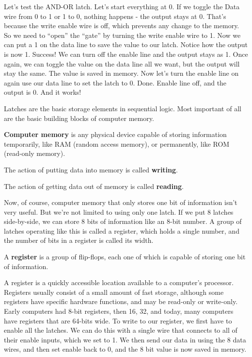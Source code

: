 
Let's test the AND-OR latch. Let's start everything at 0. If we toggle the Data wire from 0 to 1 or 1 to 0, nothing
happens - the output stays at 0. That's because the write enable wire is off, which prevents any change to the
memory. So we need to ``open'' the ``gate'' by turning the write enable wire to 1. Now we can put a 1 on the data
line to save the value to our latch. Notice how the output is now 1. Success! We can turn off the enable line and the
output stays as 1. Once again, we can toggle the value on the data line all we want, but the output will stay the
same. The value is saved in memory. Now let's turn the enable line on again use our data line to set the latch to 0.
Done. Enable line off, and the output is 0. And it works!
\ee

Latches are the basic storage elements in sequential logic. Most important of all are the basic building blocks of
computer memory.

\textbf{Computer memory} is any physical device capable of storing information temporarily, like RAM (random access
memory), or permanently, like ROM (read-only memory).
\ed

\bd[Writing]
The action of putting data into memory is called \textbf{writing}.
\ed

\bd[Reading]
The action of getting data out of memory is called \textbf{reading}.
\ed

Now, of course, computer memory that only stores one bit of information isn't very useful. But we're not limited to
using only one latch. If we put 8 latches side-by-side, we can store 8 bits of information like an 8-bit number. A
group of latches operating like this is called a register, which holds a single number, and the number of bits in a
register is called its width.

\bd[Register]
A \textbf{register} is a group of flip-flops, each one of which is capable of storing one bit of information.
\ed

A register is a quickly accessible location available to a computer's processor. Registers usually consist of a small
amount of fast storage, although some registers have specific hardware functions, and may be read-only or write-only.
Early computers had 8-bit registers, then 16, 32, and today, many computers have registers that are 64-bits wide. To
write to our register, we first have to enable all the latches. We can do this with a single wire that connects to
all of their enable inputs, which we set to 1. We then send our data in using the 8 data wires, and then set enable
back to 0, and the 8 bit value is now saved in memory.

